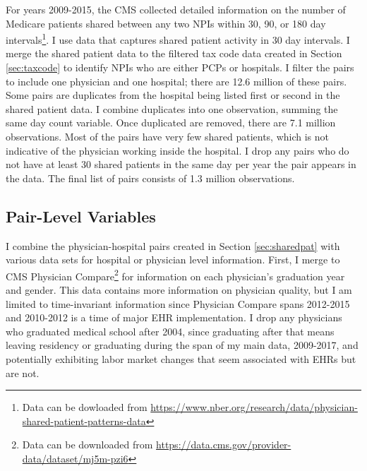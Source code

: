 \documentclass[11pt]{article}
\begin{document}
For years 2009-2015, the CMS collected detailed information on the number of Medicare patients shared between any two NPIs within 30, 90, or 180 day intervals\footnote{Data can be dowloaded from \hyperlink{https://www.nber.org/research/data/physician-shared-patient-patterns-data}{https://www.nber.org/research/data/physician-shared-patient-patterns-data}}. I use data that captures shared patient activity in 30 day intervals. I merge the shared patient data to the filtered tax code data created in Section \ref{sec:taxcode} to identify NPIs who are either PCPs or hospitals. I filter the pairs to include one physician and one hospital; there are 12.6 million of these pairs. Some pairs are duplicates from the hospital being listed first or second in the shared patient data. I combine duplicates into one observation, summing the same day count variable. Once duplicated are removed, there are 7.1 million observations. Most of the pairs have very few shared patients, which is not indicative of the physician working inside the hospital. I drop any pairs who do not have at least 30 shared patients in the same day per year the pair appears in the data. The final list of pairs consists of 1.3 million observations. 

\subsection{Pair-Level Variables}

I combine the physician-hospital pairs created in Section \ref{sec:sharedpat} with various data sets for hospital or physician level information. First, I merge to CMS Physician Compare\footnote{Data can be downloaded from \hyperlink{https://data.cms.gov/provider-data/dataset/mj5m-pzi6}{https://data.cms.gov/provider-data/dataset/mj5m-pzi6}} for information on each physician's graduation year and gender. This data contains more information on physician quality, but I am limited to time-invariant information since Physician Compare spans 2012-2015 and 2010-2012 is a time of major EHR implementation. I drop any physicians who graduated medical school after 2004, since graduating after that means leaving residency or graduating during the span of my main data, 2009-2017, and potentially exhibiting labor market changes that seem associated with EHRs but are not. 
\end{document}
